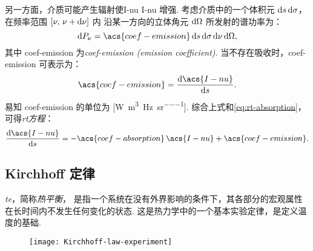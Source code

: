 另一方面，介质可能产生辐射使\acl{I-nu} \acs{I-nu} 增强.
考虑介质中的一个体积元 $\mathrm{d}s\,\mathrm{d}\sigma$，在频率范围 $[\nu, \,\nu+\mathrm{d}\nu]$ 内
沿某一方向的立体角元 $\mathrm{d}\Omega$ 所发射的谱功率为：
\begin{equation}
  \D{P_{\nu}} =
    \acs{coef-emission} \,\D{s}\,\D{\sigma}\,\D{\nu}\,\D{\Omega} ,
\end{equation}
其中 \acs{coef-emission} 为\emph{\acl{coef-emission} (emission coefficient)}.
当不存在吸收时，\acs{coef-emission} 可表示为：
\begin{equation}
  \label{eq:coef-emission}
  \acs{coef-emission} = \diff{\acs{I-nu}}{s} .
\end{equation}
易知 \acs{coef-emission} 的单位为
[\si{\watt\per\cubic\meter\per\hertz\per\steradian}].
综合上式和\autoref{eq:rt-absorption}，可得\emph{\ac{rt}方程}：
\begin{equation}
  \label{eq:radiative-transfer}
  \diff{\acs{I-nu}}{s} =
    - \acs{coef-absorption} \,\acs{I-nu} + \acs{coef-emission} .
\end{equation}

\subsection{Kirchhoff 定律}

\emph{\acf{te}}，简称\emph{热平衡}，
是指一个系统在没有外界影响的条件下，其各部分的宏观属性在长时间内不发生任何变化的状态.
这是热力学中的一个基本实验定律，是定义温度的基础.

\begin{figure}[htp]
  \centering
  \texttt{[image: Kirchhoff-law-experiment]}
  \label{fig:kirchhoff-experiment}
\end{figure}

